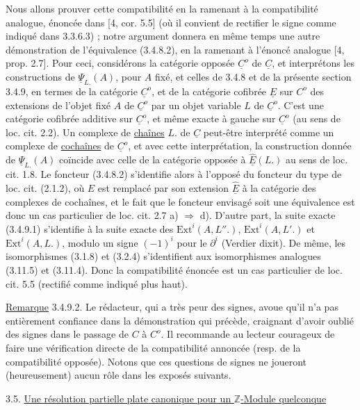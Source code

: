 Nous allons prouver cette compatibilité en la ramenant à la compatibilité analogue, énoncée dans [4, cor. 5.5] (où il convient de rectifier le signe comme indiqué dans 3.3.6.3) ; notre argument donnera en même temps une autre démonstration de l'équivalence (3.4.8.2), en la ramenant à l'énoncé analogue [4, prop. 2.7]. Pour ceci, considérons la catégorie opposée $\underline{C}^o$ de $\underline{C}$, et interprétons les constructions de $\underline{\Psi}_{L.}(A)$, pour $A$ fixé, et celles de 3.4.8 et de la présente section 3.4.9, en termes de la catégorie $\underline{C}^o$, et de la catégorie cofibrée $\underline{E}$ sur $C^o$ des extensions de l'objet fixé $A$ de $\underline{C}^o$ par un objet variable $L$ de $\underline{C}^o$. C'est une catégorie cofibrée additive sur $\underline{C}^o$, et même exacte à gauche sur $\underline{C}^o$ (au sens de loc. cit. 2.2). Un complexe de \underline{chaînes} $L.$ de $\underline{C}$ peut-être interprété  comme
un complexe de \underline{cochaînes} de $\underline{C}^o$, et avec cette interprétation, la construction donnée de $\underline{\Psi}_{L.}(A)$ coïncide avec celle de la catégorie opposée à $\underline{\hat{E}}(L.)$ au sens de loc. cit. 1.8. Le foncteur (3.4.8.2) s'identifie alors à l'opposé du foncteur du type de loc. cit. (2.1.2), où $E$ est remplacé par son extension $\underline{\hat{E}}$ à la catégorie des complexes de cochaînes, et le fait que le foncteur envisagé soit une équivalence est donc un cas particulier de loc. cit. 2.7 a) $\Longrightarrow$ d). D'autre part, la suite exacte (3.4.9.1) s'identifie à la suite exacte des $\mathrm{Ext}^i(A,L''.)$, $\mathrm{Ext}^i(A,L'.)$ et $\mathrm{Ext}^i(A,L.)$, modulo un signe $(-1)^i$ pour le $\partial^i$ (Verdier dixit). De même, les isomorphismes (3.1.8) et (3.2.4) s'identifient aux isomorphismes analogues (3.11.5) et (3.11.4). Donc la compatibilité énoncée est un cas particulier de loc. cit. 5.5 (rectifié comme indiqué plus haut).

\underline{Remarque} 3.4.9.2. Le rédacteur, qui a très peur des signes, avoue qu'il n'a pas entièrement confiance dans la démonstration qui précède, craignant d'avoir oublié des signes dans le passage de $C$ à $C^o$. Il recommande au lecteur courageux de faire une vérification directe de la compatibilité annoncée (resp. de la compatibilité opposée). Notons que ces questions de signes ne joueront (heureusement) aucun rôle dans les exposés suivants.


3.5. \underline{Une résolution partielle plate canonique pour un $\mathbb{Z}$-Module quelconque}

